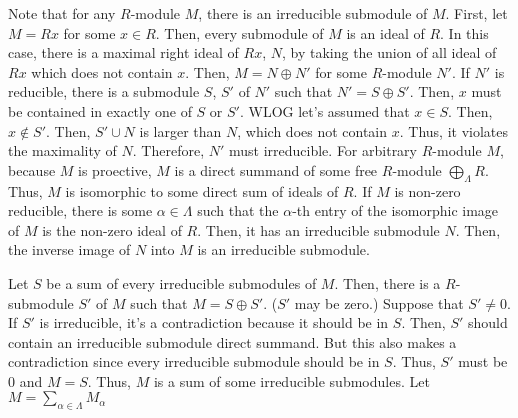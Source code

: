 Note that for any \(R\)-module \(M\), there is an irreducible submodule of \(M\).
First, let \(M = Rx\) for some \(x \in R\).
Then, every submodule of \(M\) is an ideal of \(R\).
In this case, there is a maximal right ideal of \(Rx\), \(N\),
by taking the union of all ideal of \(Rx\) which does not contain \(x\).
Then, \(M = N \oplus N'\) for some \(R\)-module \(N'\).
If \(N'\) is reducible,
there is a submodule \(S\), \(S'\) of \(N'\) such that \(N' = S \oplus S'\).
Then, \(x\) must be contained in exactly one of \(S\) or \(S'\).
WLOG let's assumed that \(x \in S\).
Then, \(x \not\in S'\).
Then, \(S' \cup N\) is larger than \(N\), which does not contain \(x\).
Thus, it violates the maximality of \(N\).
Therefore, \(N'\) must irreducible.
For arbitrary \(R\)-module \(M\),
because \(M\) is proective,
\(M\) is a direct summand of some free \(R\)-module \(\bigoplus_\Lambda R\).
Thus, \(M\) is isomorphic to some direct sum of
ideals of \(R\).
If \(M\) is non-zero reducible,
there is some \(\alpha \in \Lambda\) such that the \(\alpha\)-th entry of the isomorphic image of \(M\) is the non-zero ideal of \(R\).
Then, it has an irreducible submodule \(N\).
Then, the inverse image of \(N\) into \(M\) is an irreducible submodule.

Let \(S\) be a sum of every irreducible submodules of \(M\).
Then, there is a \(R\)-submodule \(S'\) of \(M\) such that \(M = S \oplus S'\). (\(S'\) may be zero.)
Suppose that \(S' \neq 0\).
If \(S'\) is irreducible, it's a contradiction because it should be in \(S\).
Then, \(S'\) should contain an irreducible submodule direct summand.
But this also makes a contradiction
since every irreducible submodule should be in \(S\).
Thus, \(S'\) must be \(0\) and \(M = S\).
Thus, \(M\) is a sum of some irreducible submodules.
Let \(M = \sum_{\alpha \in \Lambda} M_\alpha\)

